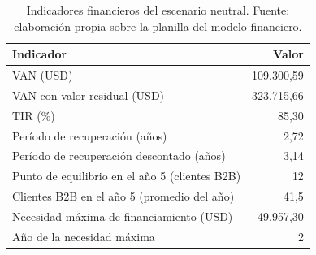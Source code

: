 \begin{table}[t]
  \centering
  \small
  \caption{Indicadores financieros del escenario neutral. Fuente: elaboración propia sobre la planilla del modelo financiero.}
  \label{tab:financiero-neutral-indicadores}
  \begin{tabular}{l r}
    \hline
    \textbf{Indicador} & \textbf{Valor} \\
    \hline
    VAN (USD) & 109.300,59 \\
    VAN con valor residual (USD) & 323.715,66 \\
    TIR (\%) & 85,30 \\
    Período de recuperación (años) & 2,72 \\
    Período de recuperación descontado (años) & 3,14 \\
    Punto de equilibrio en el año 5 (clientes B2B) & 12 \\
    Clientes B2B en el año 5 (promedio del año) & 41,5 \\
    Necesidad máxima de financiamiento (USD) & 49.957,30 \\
    Año de la necesidad máxima & 2 \\
    \hline
  \end{tabular}
\end{table}
